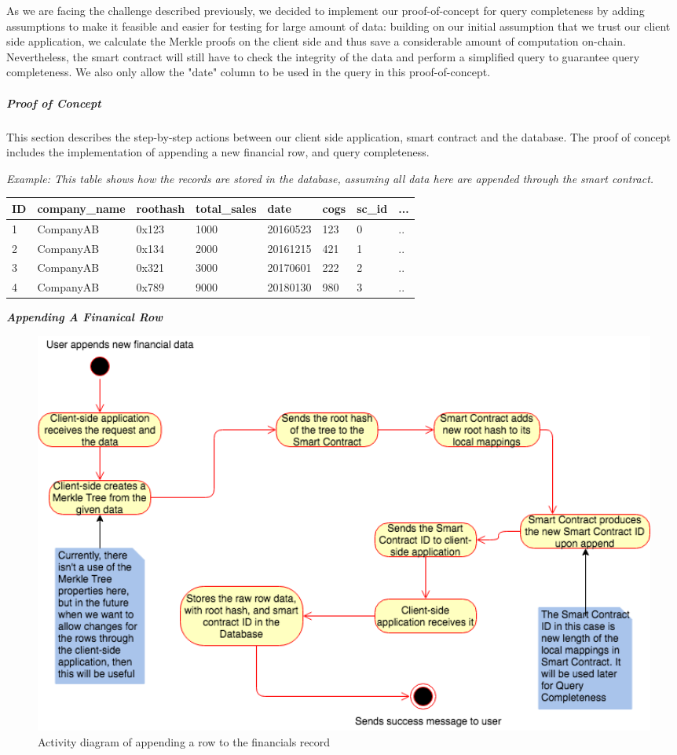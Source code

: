 As we are facing the challenge described previously, we decided to implement our proof-of-concept for query completeness by adding assumptions to make it feasible and easier for testing for large amount of data: building on our initial assumption that we trust our client side application, we calculate the Merkle proofs on the client side and thus save a considerable amount of computation on-chain. Nevertheless, the smart contract will still have to check the integrity of the data and perform a simplified query to guarantee query completeness. We also only allow the "date" column to be used in the query in this proof-of-concept.

\subparagraph{Proof of Concept}

This section describes the step-by-step actions between our client side application, smart contract and the database. The proof of concept includes the implementation of appending a new financial row, and query completeness.

\textit{Example: This table shows how the records are stored in the database, assuming all data here are appended through the smart contract.}
\begin{center}
    \begin{tabular}{| l | l | l | l | l | l | l | l |}
    \hline
    ID & company\_name & roothash & total\_sales & date & cogs & sc\_id & ... \\ \hline
    1 & CompanyAB & 0x123 & 1000 & 20160523 & 123 & 0 & .. \\ \hline
    2 & CompanyAB & 0x134 & 2000 & 20161215 & 421 & 1 & .. \\ \hline
    3 & CompanyAB & 0x321 & 3000 & 20170601 & 222 & 2 & .. \\ \hline
    4 & CompanyAB & 0x789 & 9000 & 20180130 & 980 & 3 & .. \\ \hline
    \end{tabular}
\end{center}



\textbf{\textit{Appending A Finanical Row}}

\begin{figure}[h]%
\centering
\includegraphics[width=1.0\textwidth]{images/appendRowFinancials.png}
\caption{\label{fig:appendRowFinancials}Activity diagram of appending a row to the financials record}
\end{figure}


